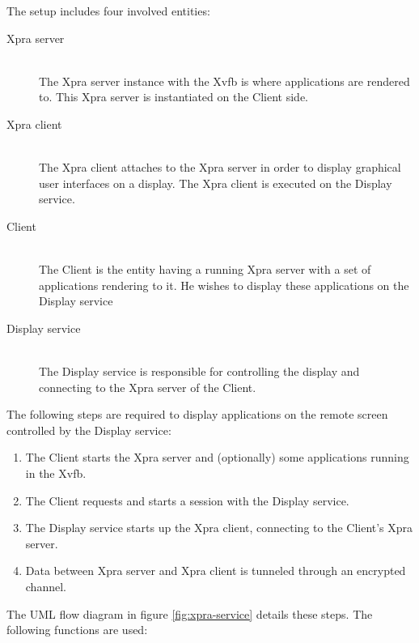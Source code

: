 The setup includes four involved entities:
\begin{description}
    \item[Xpra server]\hfill\\
        The Xpra server instance with the Xvfb is where applications are rendered to.
        This Xpra server is instantiated on the Client side.
    \item[Xpra client]\hfill\\
        The Xpra client attaches to the Xpra server in order to display graphical user interfaces on a display.
        The Xpra client is executed on the Display service.
    \item[Client]\hfill\\
        The Client is the entity having a running Xpra server with a set of applications rendering to it.
        He wishes to display these applications on the Display service
    \item[Display service]\hfill\\
        The Display service is responsible for controlling the display and connecting to the Xpra server of the Client.
\end{description}

The following steps are required to display applications on the remote screen controlled by the Display service:
\begin{enumerate}
    \item The Client starts the Xpra server and (optionally) some applications running in the Xvfb.
    \item The Client requests and starts a session with the Display service.
    \item The Display service starts up the Xpra client, connecting to the Client's Xpra server.
    \item Data between Xpra server and Xpra client is tunneled through an encrypted channel.
\end{enumerate}

The UML flow diagram in figure \ref{fig:xpra-service} details these steps.
The following functions are used:

